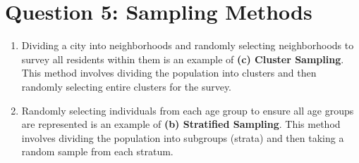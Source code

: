 \documentclass{article}
\begin{document}
\section*{Question 5: Sampling Methods}
\begin{enumerate}
    \item Dividing a city into neighborhoods and randomly selecting neighborhoods to survey all residents within them is an example of \textbf{(c) Cluster Sampling}. This method involves dividing the population into clusters and then randomly selecting entire clusters for the survey.
    \item Randomly selecting individuals from each age group to ensure all age groups are represented is an example of \textbf{(b) Stratified Sampling}. This method involves dividing the population into subgroups (strata) and then taking a random sample from each stratum.
\end{enumerate}
\end{document}
